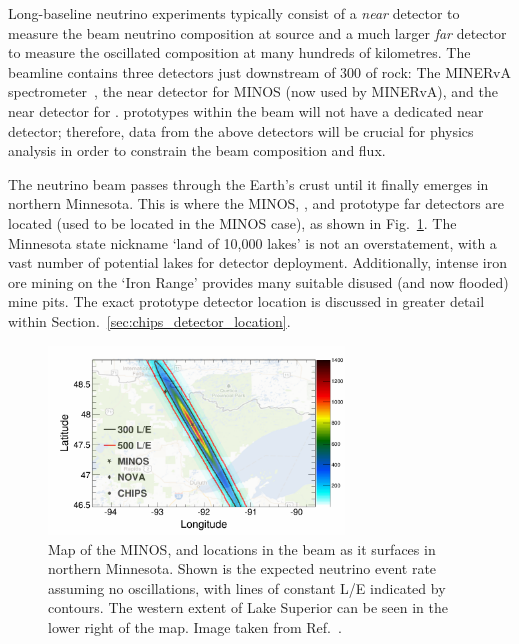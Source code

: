 Long-baseline neutrino experiments typically consist of a \emph{near} detector to measure the beam
neutrino composition at source and a much larger \emph{far} detector to measure the oscillated
composition at many hundreds of kilometres. The \numi beamline contains three detectors just
downstream of \unit{300}{} of rock: The MINERvA spectrometer~\cite{mcfarland2006}, the
near detector for MINOS (now used by MINERvA), and the near detector for \nova. \chips prototypes
within the \numi beam will not have a dedicated near detector; therefore, data from the above
detectors will be crucial for physics analysis in order to constrain the beam composition and
flux.

The \numi neutrino beam passes through the Earth's crust until it finally emerges in northern
Minnesota. This is where the MINOS, \nova, and prototype \chips far detectors are located (used to
be located in the MINOS case), as shown in Fig.~\ref{fig:numi_map}. The Minnesota state nickname
`land of 10,000 lakes' is not an overstatement, with a vast number of potential lakes for \chips
detector deployment. Additionally, intense iron ore mining on the `Iron Range' provides many
suitable disused (and now flooded) mine pits. The exact \chipsfive prototype detector location is
discussed in greater detail within Section.~\ref{sec:chips_detector_location}.

\begin{figure} %
    \includegraphics[width=0.7\textwidth]{diagrams/4-chips/numi_map.png}
    \caption[Map of detector locations in the \numi beam]
    {Map of the MINOS, \nova and \chips locations in the \numi beam as it surfaces in northern
        Minnesota. Shown is the expected neutrino event rate assuming no oscillations, with lines
        of constant L/E indicated by contours. The western extent of Lake Superior can be seen in
        the lower right of the map. Image taken from Ref.~\cite{adamson2013}.}
    \label{fig:numi_map}
\end{figure}

